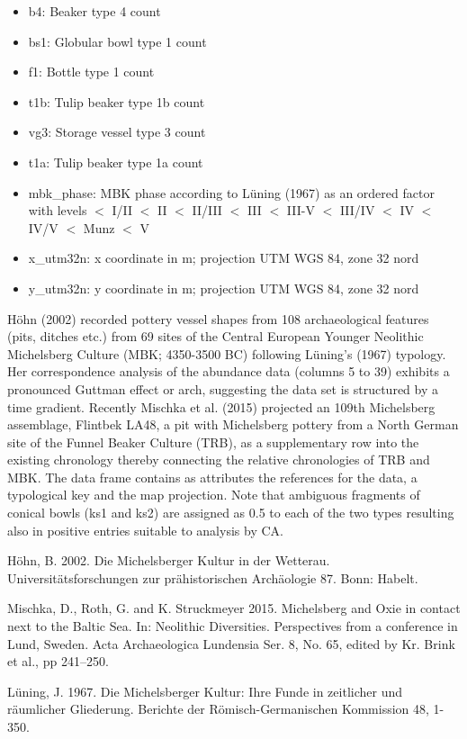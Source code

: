 \documentclass[a3, ruledsections, 8pt]{sciposter}
\begin{document}
\begin{itemize}
\item b4: Beaker type 4 count
\item bs1: Globular bowl type 1 count
\item f1: Bottle type 1 count
\item t1b: Tulip beaker type 1b count
\item vg3: Storage vessel type 3 count
\item t1a: Tulip beaker type 1a count
\item mbk\_phase: MBK phase according to Lüning (1967) as an ordered factor with levels $<$ I/II $<$ II $<$ II/III $<$ III $<$ III-V $<$ III/IV $<$ IV $<$ IV/V $<$ Munz $<$ V
\item x\_utm32n: x coordinate in m; projection UTM WGS 84, zone 32 nord
\item y\_utm32n: y coordinate in m; projection UTM WGS 84, zone 32 nord
\end{itemize}

\medskip

Höhn (2002) recorded pottery vessel shapes from 108 archaeological features (pits, ditches etc.) from 69 sites of the Central European Younger Neolithic Michelsberg Culture (MBK; 4350-3500 BC) following Lüning's (1967) typology. Her correspondence analysis of the abundance data (columns 5 to 39) exhibits a pronounced Guttman effect or arch, suggesting the data set is structured by a time gradient. Recently Mischka et al. (2015) projected an 109th Michelsberg assemblage, Flintbek LA48, a pit with Michelsberg pottery from a North German site of the Funnel Beaker Culture (TRB), as a supplementary row into the existing chronology thereby connecting the relative chronologies of TRB and MBK. The data frame contains as attributes the references for the data, a typological key and the map projection. Note that ambiguous fragments of conical bowls (ks1 and ks2) are assigned as 0.5 to each of the two types resulting also in positive entries suitable to analysis by CA.

\medskip

Höhn, B. 2002. Die Michelsberger Kultur in der Wetterau. Universitätsforschungen zur prähistorischen Archäologie 87. Bonn: Habelt.

Mischka, D., Roth, G. and K. Struckmeyer 2015. Michelsberg and Oxie in contact next to the Baltic Sea. In: Neolithic Diversities. Perspectives from a conference in Lund, Sweden. Acta Archaeologica Lundensia Ser. 8, No. 65, edited by Kr. Brink et al., pp 241–250.

Lüning, J. 1967. Die Michelsberger Kultur: Ihre Funde in zeitlicher und räumlicher Gliederung. Berichte der Römisch-Germanischen Kommission 48, 1-350.
\end{document}

